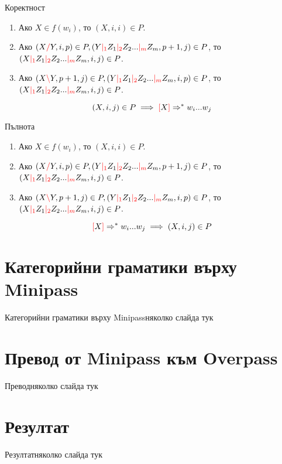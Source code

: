 \documentclass[9pt]{beamer}
\begin{document}
  \begin{frame}{Коректност}
    \begin{enumerate}
    \label{cyk:rules}
        \item Ако $X \in f(w_i)$, то $(X, i, i) \in P$.
        \item Ако $(X \textcolor{red}{/} Y, i, p) \in P, (Y \textcolor{red}{|_{1}} Z_1 \textcolor{red}{|_{2}} Z_2 ... \textcolor{red}{|_{m}} Z_m, p + 1, j) \in P$,
            то $(X \textcolor{red}{|_{1}} Z_1 \textcolor{red}{|_{2}} Z_2 ... \textcolor{red}{|_{m}} Z_m, i, j) \in P$.
        \item Ако $(X \textcolor{red}{\backslash} Y, p + 1, j) \in P, (Y \textcolor{red}{|_{1}} Z_1 \textcolor{red}{|_{2}} Z_2 ... \textcolor{red}{|_{m}} Z_m, i, p) \in P$,
            то $(X \textcolor{red}{|_{1}} Z_1 \textcolor{red}{|_{2}} Z_2 ... \textcolor{red}{|_{m}} Z_m, i, j) \in P$.
    \end{enumerate}

    \begin{equation}\label{eq:left}
        (X, i, j) \in P \implies \textcolor{red}{[} X \textcolor{red}{]} \Rightarrow^* w_i ... w_j
    \end{equation}
  \end{frame}
  \begin{frame}{Пълнота}
    \begin{enumerate}
    \label{cyk:rules}
        \item Ако $X \in f(w_i)$, то $(X, i, i) \in P$.
        \item Ако $(X \textcolor{red}{/} Y, i, p) \in P, (Y \textcolor{red}{|_{1}} Z_1 \textcolor{red}{|_{2}} Z_2 ... \textcolor{red}{|_{m}} Z_m, p + 1, j) \in P$,
            то $(X \textcolor{red}{|_{1}} Z_1 \textcolor{red}{|_{2}} Z_2 ... \textcolor{red}{|_{m}} Z_m, i, j) \in P$.
        \item Ако $(X \textcolor{red}{\backslash} Y, p + 1, j) \in P, (Y \textcolor{red}{|_{1}} Z_1 \textcolor{red}{|_{2}} Z_2 ... \textcolor{red}{|_{m}} Z_m, i, p) \in P$,
            то $(X \textcolor{red}{|_{1}} Z_1 \textcolor{red}{|_{2}} Z_2 ... \textcolor{red}{|_{m}} Z_m, i, j) \in P$.
    \end{enumerate}
    \begin{equation}\label{eq:right}
        \textcolor{red}{[} X \textcolor{red}{]} \Rightarrow^* w_i ... w_j \implies (X, i, j) \in P
    \end{equation}
  \end{frame}

  \section{Категорийни граматики върху Minipass}
  \begin{frame}{Категорийни граматики върху Minipass}няколко слайда тук\end{frame}

  \section{Превод от Minipass към Overpass}
  \begin{frame}{Превод}няколко слайда тук\end{frame}

  \section{Резултат}
  \begin{frame}{Резултат}няколко слайда тук\end{frame}
\end{document}
